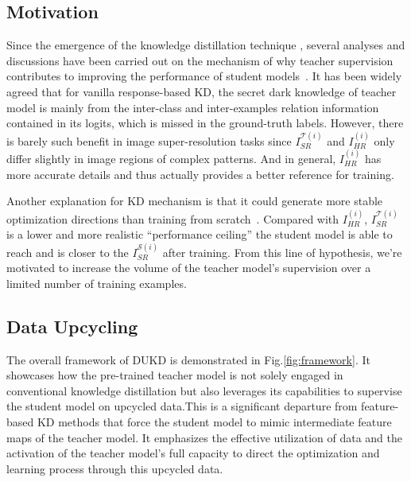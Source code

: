 \documentclass[10pt,twocolumn,letterpaper]{article}
\newcommand{\red}[1]{{\color{black}#1}}
\begin{document}
\red{
\subsection{Motivation} \label{sec: motivation}
Since the emergence of the knowledge distillation technique \cite{hinton2015distilling}, several analyses and discussions have been carried out on the mechanism of why teacher supervision contributes to improving the performance of student models~\cite{tang2020understanding,stanton2021does,wang2021revisiting,zhang2022quantifying,harutyunyan2023supervision}. It has been widely agreed that for vanilla response-based KD, the secret dark knowledge of teacher model is mainly from the inter-class and inter-examples relation information contained in its logits, which is missed in the ground-truth labels. However, there is barely such benefit in image super-resolution tasks since $I_{SR}^{\mathcal{T}(i)}$ and $I_{HR}^{(i)}$ only differ slightly in image regions of complex patterns. And in general, $I_{HR}^{(i)}$ has more accurate details and thus actually provides a better reference for training.

Another explanation for KD mechanism is that it could generate more stable optimization directions than training from scratch~\cite{tang2020understanding,zhang2022quantifying}. Compared with $I_{HR}^{(i)}$, $I_{SR}^{\mathcal{T}(i)}$ is a  lower and more realistic ``performance ceiling'' the student model is able to reach and is closer to the $I_{SR}^{\mathcal{S}(i)}$ after training. From this line of hypothesis, we're motivated to increase the volume of the teacher model's supervision over a limited number of training examples.
}

\subsection{Data Upcycling} \label{sec: unlabeled-data}

The overall framework of DUKD is demonstrated in Fig.\ref{fig:framework}. It showcases how the pre-trained teacher model is not solely engaged in conventional knowledge distillation but also leverages its capabilities to supervise the student model on upcycled data.This is a significant departure from feature-based KD methods that force the student model to mimic intermediate feature maps of the teacher model. It emphasizes the effective utilization of data and the activation of the teacher model's full capacity to direct the optimization and learning process through this upcycled data.
\end{document}
